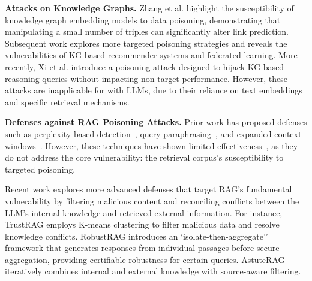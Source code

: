 \vspace{2pt}
{\bf Attacks on Knowledge Graphs.} Zhang et al. highlight the susceptibility of knowledge graph embedding models to data poisoning, demonstrating that manipulating a small number of triples can significantly alter link prediction. Subsequent work explores more targeted poisoning strategies and reveals the vulnerabilities of KG-based recommender systems and federated learning. More recently, Xi et al. introduce a poisoning attack designed to hijack KG-based reasoning queries without impacting non-target performance. However, these attacks are inapplicable for \rag with LLMs, due to their reliance on text embeddings and specific retrieval mechanisms.

\vspace{2pt}
{\bf Defenses against RAG Poisoning Attacks.}
Prior work has proposed defenses such as perplexity-based detection~, query paraphrasing~, and expanded context windows~. However, these techniques have shown limited effectiveness~, as they do not address the core vulnerability: the retrieval corpus's susceptibility to targeted poisoning.

Recent work explores more advanced defenses that target RAG's fundamental vulnerability by filtering malicious content and reconciling conflicts between the LLM's internal knowledge and retrieved external information. For instance, TrustRAG employs K-means clustering to filter malicious data and resolve knowledge conflicts. RobustRAG introduces an `isolate-then-aggregate'' framework that generates responses from individual passages before secure aggregation, providing certifiable robustness for certain queries. AstuteRAG~ iteratively combines internal and external knowledge with source-aware filtering.


